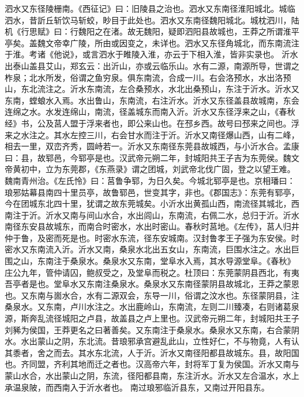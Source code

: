 \documentclass[12pt,UTF8]{ctexbook}
\begin{document}
泗水又东径陵栅南。《西征记》曰：旧陵县之治也。泗水又东南径淮阳城北。城临泗水，昔訢丘斩饮马斩蛟，眇目于此处也。泗水又东南径魏阳城北。城枕泗川，陆机《行思赋》曰：行魏阳之在渚。故无魏阳，疑即泗阳县故城也，王莽之所谓淮平亭矣。盖魏文帝幸广陵，所由或因变之，未详也。泗水又东径角城北，而东南流注于淮。考诸《他说》，或言泗水于睢陵入淮，亦云于下相入淮，皆非实录也。
沂水出泰山盖县艾山，郑玄云：出沂山，亦或云临乐山。水有二源，南源所导，世谓之柞泉；北水所发，俗谓之鱼穷泉。俱东南流，合成一川。右会洛预水，水出洛预山，东北流注之。沂水东南流，左合桑预水，水北出桑预山，东注于沂水。沂水又东南，螳蜋水入焉。水出鲁山，东南流，右注沂水。沂水又东径盖县故城南，东会连绵之水。水发连绵山，南流，径盖城东而南入沂。沂水又东径浮来之山，《春秋经》书，公及莒人盟于浮来者也，即公来山也。在邳乡西。故号曰邳来之间也。浮来之水注之。其水左控三川，右会甘水而注于沂。沂水又南径爆山西，山有二峰，相去一里，双峦齐秀，圆峙若一。沂水又东南径东莞县故城西，与小沂水合。孟康曰：县，故郓邑，今郓亭是也。汉武帝元朔二年，封城阳共王子吉为东莞侯。魏文帝黄初中，立为东莞郡，《东燕录》谓之团城，刘武帝北伐广固，登之以望王难。魏南青州治。《左氏怜》曰：莒鲁争郓，为日久矣。今城北郓亭是也。京相璠曰：琅邪姑幕县南四十里员亭，故鲁郓邑，世变其字，非也。《郡国志》：东莞有郓亭，今在团城东北四十里，犹谓之故东莞城矣。小沂水出黄孤山西，南流径其城北，西南注于沂。沂水又南与间山水合，水出闾山，东南流，右佩二水，总归于沂。沂水南径东安县故城东，而南合时密水，水出时密山。春秋时莒地。《左传》，莒人归井仲于鲁，及密而死是也。时密水东流，径东安城南。汉封鲁孝王子强为东安侯。时密水又东南流入沂。沂水又南，桑泉水北出五女山，东南流，巨围水注之。水出巨围之山，东南注于桑泉水。桑泉水又东南，堂阜水入焉，其水导源堂阜。《春秋》庄公九年，管仲请囚，鲍叔受之，及堂阜而税之。杜顶曰：东莞蒙阴县西北，有夷吾亭者是也。堂阜水又东南注桑泉水。桑泉水又东南径蒙阴县故城北，王莽之蒙恩也。又东南与崮水合，水有二源双会，东导一川，俗谓之汶水也。东径蒙阴县，注桑泉水。又东南，卢川水注之。水出鹿岭山，东南流，左则二川臻凑，右则诸葛泉源，斯奔乱流径城阳之卢县，故盖县之卢上里也。汉武帝元朔二年，封城阳共王子刘豨为侯国，王莽更名之曰著善矣。又东南注于桑泉水。桑泉水又东南，右合蒙阴水。水出蒙山之阴，东北流。昔琅邪承宫避乱此山，立性好仁，不与物竟，人有认其黍者，舍之而去。其水东北流，人于沂。沂水又南径阳都县故城东。县，故阳国也。齐同盟，齐利其地而迁之者也。汉高帝六年，封将军丁复为侯国。沂水又南与蒙山水合，水出蒙山之阴，东流，径阳都县南，东注沂水。沂水又左合温水，水上承温泉陂，而西南入于沂水者也。
南过琅邪临沂县东，又南过开阳县东。
\end{document}

